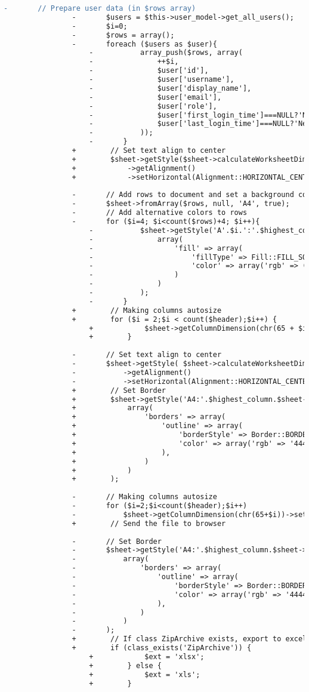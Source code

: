 \begin{lstlisting}[language=diff, caption=Perubahan pada kode Users.php]
				-		// Prepare user data (in $rows array)
				-		$users = $this->user_model->get_all_users();
				-		$i=0;
				-		$rows = array();
				-		foreach ($users as $user){
					-			array_push($rows, array(
					-				++$i,
					-				$user['id'],
					-				$user['username'],
					-				$user['display_name'],
					-				$user['email'],
					-				$user['role'],
					-				$user['first_login_time']===NULL?'Never':$user['first_login_time'],
					-				$user['last_login_time']===NULL?'Never':$user['last_login_time']
					-			));
					-		}
				+        // Set text align to center
				+        $sheet->getStyle($sheet->calculateWorksheetDimension())
				+            ->getAlignment()
				+            ->setHorizontal(Alignment::HORIZONTAL_CENTER);
				
				-		// Add rows to document and set a background color of #7BD1BE
				-		$sheet->fromArray($rows, null, 'A4', true);
				-		// Add alternative colors to rows
				-		for ($i=4; $i<count($rows)+4; $i++){
					-			$sheet->getStyle('A'.$i.':'.$highest_column.$i)->applyFromArray(
					-				array(
					-					'fill' => array(
					-						'fillType' => Fill::FILL_SOLID,
					-						'color' => array('rgb' => (($i%2)?'F0F0F0':'FAFAFA'))
					-					)
					-				)
					-			);
					-		}
				+        // Making columns autosize
				+        for ($i = 2;$i < count($header);$i++) {
					+            $sheet->getColumnDimension(chr(65 + $i))->setAutoSize(true);
					+        }
				
				-		// Set text align to center
				-		$sheet->getStyle( $sheet->calculateWorksheetDimension() )
				-			->getAlignment()
				-			->setHorizontal(Alignment::HORIZONTAL_CENTER);
				+        // Set Border
				+        $sheet->getStyle('A4:'.$highest_column.$sheet->getHighestRow())->applyFromArray(
				+            array(
				+                'borders' => array(
				+                    'outline' => array(
				+                        'borderStyle' => Border::BORDER_THIN,
				+                        'color' => array('rgb' => '444444'),
				+                    ),
				+                )
				+            )
				+        );
				
				-		// Making columns autosize
				-		for ($i=2;$i<count($header);$i++)
				-			$sheet->getColumnDimension(chr(65+$i))->setAutoSize(true);
				+        // Send the file to browser
				
				-		// Set Border
				-		$sheet->getStyle('A4:'.$highest_column.$sheet->getHighestRow())->applyFromArray(
				-			array(
				-				'borders' => array(
				-					'outline' => array(
				-						'borderStyle' => Border::BORDER_THIN,
				-						'color' => array('rgb' => '444444'),
				-					),
				-				)
				-			)
				-		);
				+        // If class ZipArchive exists, export to excel2007, otherwise export to excel5
				+        if (class_exists('ZipArchive')) {
					+            $ext = 'xlsx';
					+        } else {
					+            $ext = 'xls';
					+        }
				

\end{lstlisting}
